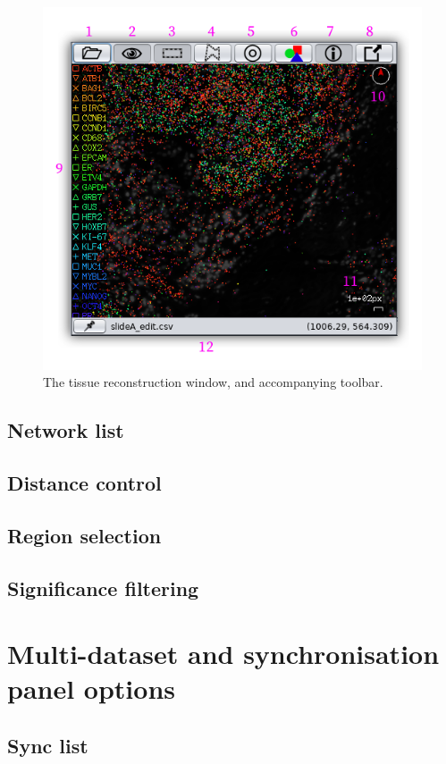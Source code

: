 \documentclass[a4paper,12pt]{article}
\begin{document}
\begin{figure}[htb]
	\caption{The tissue reconstruction window, and accompanying toolbar.}\label{fig:recon_details}
	\centering
	\includegraphics[width=\textwidth]{recon_details-shadow}
\end{figure}

\subsection{Network list}
\subsection{Distance control}
\subsection{Region selection}
\subsection{Significance filtering}

\section{Multi-dataset and synchronisation panel options}
\subsection{Sync list}
\end{document}
